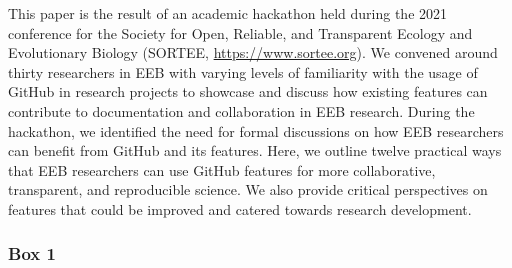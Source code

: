 This paper is the result of an academic hackathon held during the 2021 conference for the Society for Open, Reliable, and Transparent Ecology and Evolutionary Biology (SORTEE, \url{https://www.sortee.org}).
We convened around thirty researchers in EEB with varying levels of familiarity with the usage of GitHub in research projects to showcase and discuss how existing features can contribute to documentation and collaboration in EEB research.
During the hackathon, we identified the need for formal discussions on how EEB researchers can benefit from GitHub and its features.
Here, we outline twelve practical ways that EEB researchers can use GitHub features for more collaborative, transparent, and reproducible science.
We also provide critical perspectives on features that could be improved and catered towards research development.

\hypertarget{definitions}{%
\subsubsection{Box 1}\label{definitions}}

